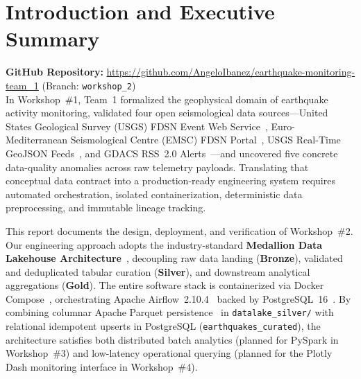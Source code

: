 \section{Introduction and Executive Summary}
\noindent\textbf{GitHub Repository:} \url{https://github.com/AngeloIbanez/earthquake-monitoring-team_1} (Branch: \texttt{workshop\_2})\\[0.15cm]
In Workshop~\#1, Team~1 formalized the geophysical domain of earthquake activity monitoring, validated four open seismological data sources---United States Geological Survey (USGS) FDSN Event Web Service~\cite{usgs_fdsn}, Euro-Mediterranean Seismological Centre (EMSC) FDSN Portal~\cite{emsc_fdsn}, USGS Real-Time GeoJSON Feeds~\cite{usgs_rt}, and GDACS RSS~2.0 Alerts~\cite{gdacs}---and uncovered five concrete data-quality anomalies across raw telemetry payloads. Translating that conceptual data contract into a production-ready engineering system requires automated orchestration, isolated containerization, deterministic data preprocessing, and immutable lineage tracking.

This report documents the design, deployment, and verification of Workshop~\#2. Our engineering approach adopts the industry-standard \textbf{Medallion Data Lakehouse Architecture}~\cite{armbrust2021lakehouse}, decoupling raw data landing (\textbf{Bronze}), validated and deduplicated tabular curation (\textbf{Silver}), and downstream analytical aggregations (\textbf{Gold}). The entire software stack is containerized via Docker Compose~\cite{docker_docs}, orchestrating Apache Airflow~2.10.4~\cite{airflow_docs} backed by PostgreSQL~16~\cite{postgres_docs}. By combining columnar Apache Parquet persistence~\cite{parquet_docs} in \texttt{datalake\_silver/} with relational idempotent upserts in PostgreSQL (\texttt{earthquakes\_curated}), the architecture satisfies both distributed batch analytics (planned for PySpark in Workshop~\#3) and low-latency operational querying (planned for the Plotly Dash monitoring interface in Workshop~\#4).

